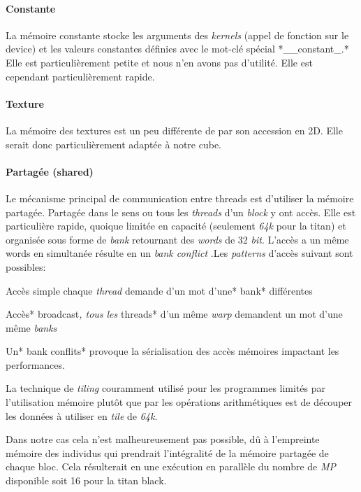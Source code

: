 \documentclass[french, 11pt]{memoir}
\begin{document}
\paragraph{Constante}\label{constante}

La mémoire constante stocke les arguments des \emph{kernels} (appel de
fonction sur le device) et les valeurs constantes définies avec le
mot-clé spécial *\_\_constant\_.* Elle est particulièrement petite et
nous n'en avons pas d'utilité. Elle est cependant particulièrement
rapide.

\paragraph{Texture}\label{texture}

La mémoire des textures est un peu différente de par son accession en
2D. Elle serait donc particulièrement adaptée à notre cube.

\paragraph{Partagée (shared)}\label{partaguxe9e-shared}

Le mécanisme principal de communication entre threads est d'utiliser la
mémoire partagée. Partagée dans le sens ou tous les \emph{threads} d'un
\emph{block} y ont accès. Elle est particulière rapide, quoique limitée
en capacité (seulement \emph{64k} pour la titan) et organisée sous forme
de \emph{bank} retournant des \emph{words} de 32 \emph{bit}. L'accès a
un même words en simultanée résulte en un \emph{bank conflict} .Les
\emph{patterns} d'accès suivant sont possibles:

Accès simple chaque \emph{thread} demande d'un mot d'une* bank*
différentes

Accès* broadcast\emph{, tous les }threads* d'un même \emph{warp}
demandent un mot d'une même \emph{banks}

Un* bank conflits* provoque la sérialisation des accès mémoires
impactant les performances.

La technique de \emph{tiling} couramment utilisé pour les programmes
limités par l'utilisation mémoire plutôt que par les opérations
arithmétiques est de découper les données à utiliser en \emph{tile} de
\emph{64k}.

Dans notre cas cela n'est malheureusement pas possible, dû à l'empreinte
mémoire des individus qui prendrait l'intégralité de la mémoire partagée
de chaque bloc. Cela résulterait en une exécution en parallèle du nombre
de \emph{MP} disponible soit 16 pour la titan black.
\end{document}
